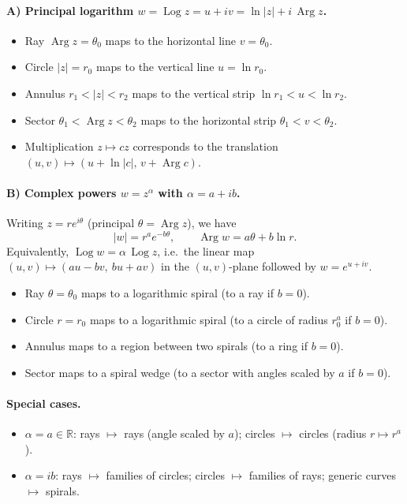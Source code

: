 \documentclass[11pt,a4paper]{article}
\theoremstyle{definition}
\theoremstyle{definition}
\theoremstyle{plain}
\theoremstyle{remark}
\DeclareMathOperator{\Log}{Log}
\DeclareMathOperator{\Arg}{Arg}
\begin{document}
\paragraph{A) Principal logarithm $w=\Log z=u+iv=\ln|z|+i\,\Arg z$.}
\begin{itemize}
	\item Ray $\Arg z=\theta_0$ maps to the horizontal line $v=\theta_0$.
	\item Circle $|z|=r_0$ maps to the vertical line $u=\ln r_0$.
	\item Annulus $r_1<|z|<r_2$ maps to the vertical strip $\ln r_1<u<\ln r_2$.
	\item Sector $\theta_1<\Arg z<\theta_2$ maps to the horizontal strip $\theta_1<v<\theta_2$.
	\item Multiplication $z\mapsto c z$ corresponds to the translation $(u,v)\mapsto(u+\ln|c|,\,v+\Arg c)$.
\end{itemize}

\paragraph{B) Complex powers $w=z^\alpha$ with $\alpha=a+ib$.}
Writing $z=re^{i\theta}$ (principal $\theta=\Arg z$), we have
\[
|w|=r^{a}e^{-b\theta},\qquad \Arg w=a\theta + b\ln r.
\]
Equivalently, $\Log w = \alpha\,\Log z$, i.e.\ the linear map $(u,v)\mapsto(au-bv,\ bu+av)$ in the $(u,v)$-plane followed by $w=e^{u+iv}$.
\begin{itemize}
	\item Ray $\theta=\theta_0$ maps to a logarithmic spiral (to a ray if $b=0$).
	\item Circle $r=r_0$ maps to a logarithmic spiral (to a circle of radius $r_0^{a}$ if $b=0$).
	\item Annulus maps to a region between two spirals (to a ring if $b=0$).
	\item Sector maps to a spiral wedge (to a sector with angles scaled by $a$ if $b=0$).
\end{itemize}

\paragraph{Special cases.}
\begin{itemize}
	\item $\alpha=a\in\mathbb{R}$: rays $\mapsto$ rays (angle scaled by $a$); circles $\mapsto$ circles (radius $r\mapsto r^a$).
	\item $\alpha=ib$: rays $\mapsto$ families of circles; circles $\mapsto$ families of rays; generic curves $\mapsto$ spirals.
\end{itemize}
\end{document}
